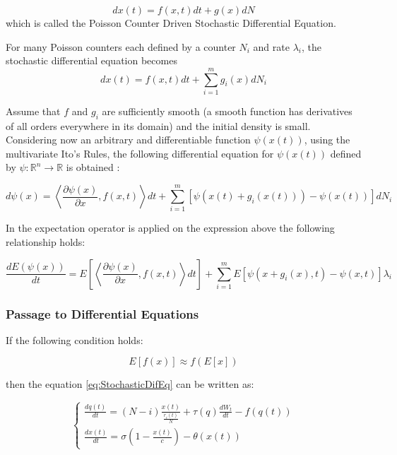 \begin{equation}
dx(t) = f(x,t) dt + g(x)dN 
\label{eq:SumStochasticDifEq}
\end{equation}
which is called the Poisson Counter Driven Stochastic Differential Equation.

For many Poisson counters each defined by a counter $N_{i}$ and rate $\lambda_{i}$, the stochastic differential equation becomes
\begin{equation}
dx(t) = f(x,t) dt + \sum\limits_{i=1}^m g_{i}(x)dN_{i}
\label{eq:StochasticDifEq}
\end{equation}

Assume that $f$ and $g_{i}$  are sufficiently smooth (a smooth function has derivatives of all orders everywhere in its domain) and the initial density is small. Considering now an arbitrary and differentiable function $\psi(x (t))$, using the multivariate Ito's Rules, the following differential equation for $\psi(x(t))$ defined by $\psi: \mathbb{R}^{n} \rightarrow \mathbb{R}$  is obtained \cite{}:

\begin{equation}
d\psi(x) = \left\langle\frac{\partial\psi(x)}{\partial x}, f(x,t)\right\rangle dt + \sum\limits_{i=1}^m [\psi(x(t)+g_{i}(x(t))) - \psi(x(t))]dN_{i}
\end{equation}

In the expectation operator is applied on the expression above the following relationship holds:

\begin{equation}
\frac{dE(\psi(x))}{dt} = E\left[\left\langle \frac{\partial\psi(x)}{\partial x}, f(x,t)\right\rangle dt \right] + \sum\limits_{i=1}^m E\left[\psi(x+g_{i}(x),t) - \psi(x,t)\right]\lambda_{i}
\end{equation}

\subsubsection{Passage to Differential Equations}

If the following condition holds:

\begin{equation}
E[f(x)] \approx f(E[x])
\end{equation}

then the equation \ref{eq:StochasticDifEq} can be written as:

\begin{equation}
\begin{cases}
\frac{dq(t)}{dt}= (N-i)\frac{x(t)}{\frac{r_{i}(t)}{N}} +\tau(q) \frac{dW_{t}}{dt} - f(q(t)) \\
\frac{dx(t)}{dt} = \sigma (1-\frac{x(t)}{c})- \theta (x(t))
\end{cases}
\label{eq:FluidFlowmodelforProcessesQueue1}
\end{equation}

